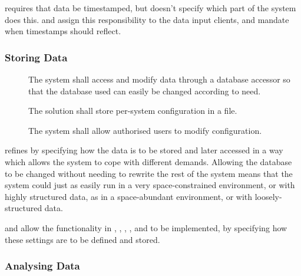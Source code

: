  requires that data be timestamped, but doesn’t specify which
part of the system does this.  and  assign this
responsibility to the data input clients, and mandate when timestamps
should reflect.

\subsubsection{Storing Data}
\label{sec:requirements-functional-storing}

\begin{description}
 \item[] The system shall access and modify data through a
 database accessor so that the database used can easily be changed
 according to need.

 \item[] The solution shall store per-system configuration in
 a file.

 \item[] The system shall allow authorised users to modify
 configuration. 
\end{description}

 refines  by specifying how the data is to be stored and
later accessed in a way which allows the system to cope with different
demands. Allowing the database to be changed without needing to
rewrite the rest of the system means that the system could just as
easily run in a very space-constrained environment, or with highly
structured data, as in a space-abundant environment, or with
loosely-structured data.

 and  allow the functionality in , ,
, , and  to be implemented, by specifying how these
settings are to be defined and stored.

\subsubsection{Analysing Data}
\label{sec:requirements-functional-analysing}


